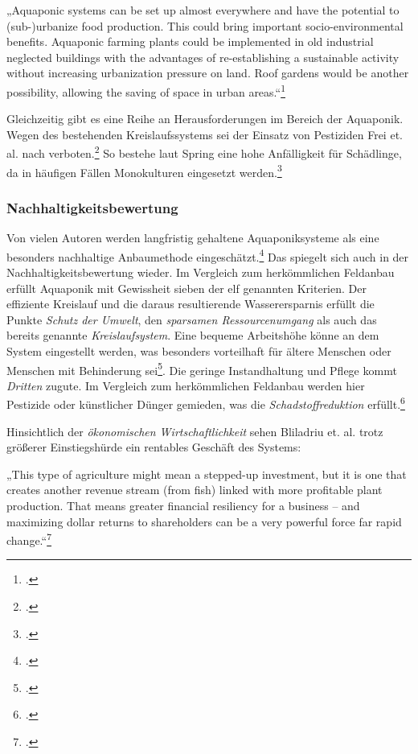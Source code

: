 \documentclass{scrartcl}
\begin{document}
\begin{displayquote}
„Aquaponic systems can be set up almost everywhere and have the potential to (sub-)urbanize food production. This could bring important socio-environmental benefits. Aquaponic farming plants could be implemented in old industrial neglected buildings with the advantages of re-establishing a sustainable activity without increasing urbanization pressure on land. Roof gardens would be another possibility, allowing the saving of space in urban areas.“\footcites[S.4214]{Goddek2015ChallengesAquaponics}
\end{displayquote}
Gleichzeitig gibt es eine Reihe an Herausforderungen im Bereich der Aquaponik. Wegen des bestehenden Kreislaufssystems sei der Einsatz von Pestiziden Frei et. al. nach verboten.\footcite[S.43]{FreiMatthiasHartmann2007AquaponikGemuse.}  So bestehe laut Spring eine hohe Anfälligkeit für Schädlinge, da in häufigen Fällen Monokulturen eingesetzt werden.\footcite[S.27]{Spring2012DerBasel-Stadt} 

\subsubsection{Nachhaltigkeitsbewertung}
Von vielen Autoren werden langfristig gehaltene Aquaponiksysteme als eine besonders nachhaltige Anbaumethode eingeschätzt.\footcites[Vgl.][S.6]{Blidariu2011NcreasingAquaponics-Review}[S.10]{Al-Kodmany2018TheCity}[S.36]{TysonV.2007ReconcilingMedium}[S.37]{Spring2012DerBasel-Stadt} Das spiegelt sich auch in der Nachhaltigkeitsbewertung wieder. Im Vergleich zum herkömmlichen Feldanbau erfüllt Aquaponik mit Gewissheit sieben der elf genannten Kriterien.
Der effiziente Kreislauf und die daraus resultierende Wasserersparnis erfüllt die Punkte \textit{Schutz der Umwelt}, den \textit{sparsamen Ressourcenumgang} als auch das bereits genannte \textit{Kreislaufsystem}. Eine bequeme Arbeitshöhe könne an dem System eingestellt werden, was besonders vorteilhaft für ältere Menschen oder Menschen mit Behinderung sei\footcite[Vgl.][S.6]{Blidariu2011NcreasingAquaponics-Review}. Die geringe Instandhaltung und Pflege kommt \textit{Dritten} zugute. Im Vergleich zum herkömmlichen Feldanbau werden hier Pestizide oder künstlicher Dünger gemieden, was die \textit{Schadstoffreduktion} erfüllt.\footcite[Vgl.][S.10]{Al-Kodmany2018TheCity}

Hinsichtlich der \textit{ökonomischen Wirtschaftlichkeit} sehen Bliladriu et. al. trotz größerer Einstiegshürde ein rentables Geschäft des Systems:
\begin{displayquote}
„This type of agriculture might mean a stepped-up investment, but it is one that creates another revenue stream (from fish) linked with more profitable plant production. That means greater financial resiliency for a business – and maximizing dollar returns to shareholders can be a very powerful force far rapid change.“\footcite[Vgl.][S.6]{Blidariu2011NcreasingAquaponics-Review}
\end{displayquote}
\end{document}
